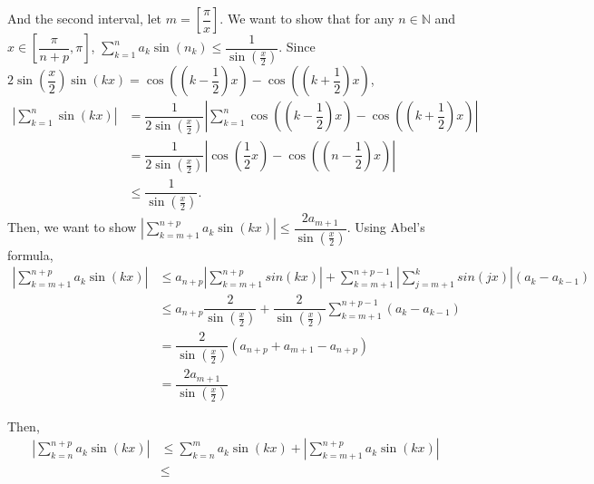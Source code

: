 \documentclass[12pt]{article}
\begin{document}
\begin{enumerate}
\begin{enumerate}
        \newpage
        And the second interval, let $m = [\dfrac{\pi}{x}]$.
        We want to show that for any $n\in\mathbb{N}$ and $x\in [\dfrac{\pi}{n+p}, \pi]$, $\displaystyle\sum_{k=1}^{n} a_k \sin(n_k) \leq \dfrac{1}{\sin(\frac{x}{2})}$.
        Since $2\sin(\dfrac{x}{2})\sin(kx) = \cos((k-\dfrac{1}{2})x) - \cos((k+\dfrac{1}{2})x)$,
        \begin{align*}
            |\sum_{k=1}^{n} \sin(kx)| &= \dfrac{1}{2\sin(\frac{x}{2})}|\sum_{k=1}^{n} \cos((k-\dfrac{1}{2})x) - \cos((k+\dfrac{1}{2})x)|\\
            &= \dfrac{1}{2\sin(\frac{x}{2})} |\cos(\dfrac{1}{2}x) - \cos((n-\dfrac{1}{2})x)|\\
            &\leq \dfrac{1}{\sin(\frac{x}{2})}.
        \end{align*}
        Then, we want to show $|\displaystyle\sum_{k=m+1}^{n+p} a_k \sin(kx)|\leq \dfrac{2a_{m+1}}{\sin(\frac{x}{2})}$.
        Using Abel's formula, \begin{align*}
            |\sum_{k=m+1}^{n+p} a_k\sin(kx)| &\leq a_{n+p} |\sum_{k=m+1}^{n+p} sin(kx)| + \sum_{k=m+1}^{n+p-1} |\sum_{j=m+1}^{k} sin(jx)|(a_k - a_{k-1})\\
            &\leq a_{n+p}\dfrac{2}{\sin(\frac{x}{2})} + \dfrac{2}{\sin(\frac{x}{2})} \sum_{k=m+1}^{n+p-1}(a_k - a_{k-1})\\
            &= \dfrac{2}{\sin(\frac{x}{2})} (a_{n+p} + a_{m+1} - a_{n+p})\\
            &= \dfrac{2a_{m+1}}{\sin(\frac{x}{2})}
        \end{align*}

        Then, \begin{align*}
            |\sum_{k=n}^{n+p} a_k \sin(kx)| &\leq \sum_{k=n}^{m} a_k \sin(kx) + |\sum_{k=m+1}^{n+p} a_k\sin(kx)|\\
            & \leq 
        \end{align*}
        
    \end{enumerate}
\end{enumerate}
\end{document}
